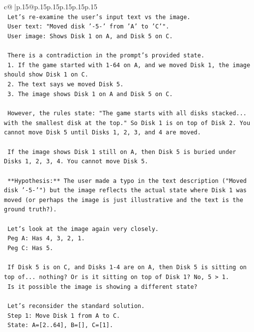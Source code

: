 \documentclass{article}
\begin{document}
{\begin{supertabular}{c@{$\;$}|p{.15\linewidth}@{}p{.15\linewidth}p{.15\linewidth}p{.15\linewidth}p{.15\linewidth}p{.15\linewidth}}
{{{\\ 
\texttt{    Let's re{-}examine the user's input text vs the image.} \\
\texttt{    User text: "Moved disk '{-}5{-}' from 'A' to 'C'".} \\
\texttt{    User image: Shows Disk 1 on A, and Disk 5 on C.} \\
\\ 
\texttt{    There is a contradiction in the prompt's provided state.} \\
\texttt{    1. If the game started with 1{-}64 on A, and we moved Disk 1, the image should show Disk 1 on C.} \\
\texttt{    2. The text says we moved Disk 5.} \\
\texttt{    3. The image shows Disk 1 on A and Disk 5 on C.} \\
\\ 
\texttt{    However, the rules state: "The game starts with all disks stacked... with the smallest disk at the top." So Disk 1 is on top of Disk 2. You cannot move Disk 5 until Disks 1, 2, 3, and 4 are moved.} \\
\\ 
\texttt{    If the image shows Disk 1 still on A, then Disk 5 is buried under Disks 1, 2, 3, 4. You cannot move Disk 5.} \\
\\ 
\texttt{    **Hypothesis:** The user made a typo in the text description ("Moved disk '{-}5{-}'") but the image reflects the actual state where Disk 1 was moved (or perhaps the image is just illustrative and the text is the ground truth?).} \\
\\ 
\texttt{    Let's look at the image again very closely.} \\
\texttt{    Peg A: Has 4, 3, 2, 1.} \\
\texttt{    Peg C: Has 5.} \\
\\ 
\texttt{    If Disk 5 is on C, and Disks 1{-}4 are on A, then Disk 5 is sitting on top of... nothing? Or is it sitting on top of Disk 1? No, 5 > 1.} \\
\texttt{    Is it possible the image is showing a different state?} \\
\\ 
\texttt{    Let's reconsider the standard solution.} \\
\texttt{    Step 1: Move Disk 1 from A to C.} \\
\texttt{    State: A={[}2..64{]}, B={[}{]}, C={[}1{]}.} \\
}}}
\end{supertabular}}
\end{document}
